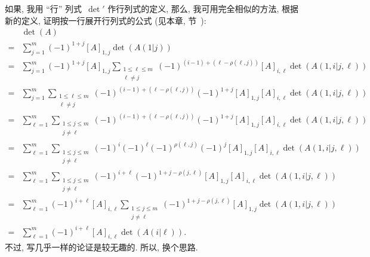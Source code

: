 如果, 我用
``行'' 列式~\(\operatorname{det}'\)
作行列式的定义,
那么, 我可用完全相似的方法,
根据新的定义,
证明按一行展开行列式的公式
(见本章, 节~):%
\begin{align*}
         & \det {(A)}                  \\
    = {} &
    \sum_{j = 1}^{m} {
    (-1)^{1+j} [A]_{1,j} \det {(A(1|j))}
    }
    \\
    = {} &
    \sum_{j = 1}^{m} {
    (-1)^{1+j} [A]_{1,j}
    \sum_{\substack{1 \leq \ell \leq m \\ \ell \neq j}} {
    (-1)^{(i - 1) + (\ell - \rho(\ell, j))}
        [A]_{i,\ell} \det {(A({1,i}|{j,\ell}))}
    }
    }
    \\
    = {} &
    \sum_{j = 1}^{m} {
    \sum_{\substack{1 \leq \ell \leq m \\ \ell \neq j}} {
    (-1)^{(i - 1) + (\ell - \rho(\ell, j))}
    (-1)^{1+j}
        [A]_{1,j} [A]_{i,\ell} \det {(A({1,i}|{j,\ell}))}
    }
    }
    \\
    = {} &
    \sum_{\ell = 1}^{m} {
    \sum_{\substack{1 \leq j \leq m    \\ j \neq \ell}} {
    (-1)^{(i - 1) + (\ell - \rho(\ell, j))}
    (-1)^{1+j}
        [A]_{1,j} [A]_{i,\ell} \det {(A({1,i}|{j,\ell}))}
    }
    }
    \\
    = {} &
    \sum_{\ell = 1}^{m} {
    \sum_{\substack{1 \leq j \leq m    \\ j \neq \ell}} {
    (-1)^{i} (-1)^{\ell} (-1)^{\rho(\ell, j)} (-1)^{j}
        [A]_{1,j} [A]_{i,\ell} \det {(A({1,i}|{j,\ell}))}
    }
    }
    \\
    = {} &
    \sum_{\ell = 1}^{m} {
    \sum_{\substack{1 \leq j \leq m    \\ j \neq \ell}} {
    (-1)^{i + \ell} (-1)^{1 + j - \rho(j, \ell)}
        [A]_{1,j} [A]_{i,\ell} \det {(A({1,i}|{j,\ell}))}
    }
    }
    \\
    = {} &
    \sum_{\ell = 1}^{m} {(-1)^{i + \ell} [A]_{i,\ell}
    \sum_{\substack{1 \leq j \leq m    \\ j \neq \ell}} {
    (-1)^{1 + j - \rho(j, \ell)}
        [A]_{1,j} \det {(A({1,i}|{j,\ell}))}
    }
    }
    \\
    = {} &
    \sum_{\ell = 1}^{m} {(-1)^{i + \ell} [A]_{i,\ell}
    \det {(A(i|\ell))}
    }.
\end{align*}%
不过, 写几乎一样的论证是较无趣的.
所以, 换个思路.

